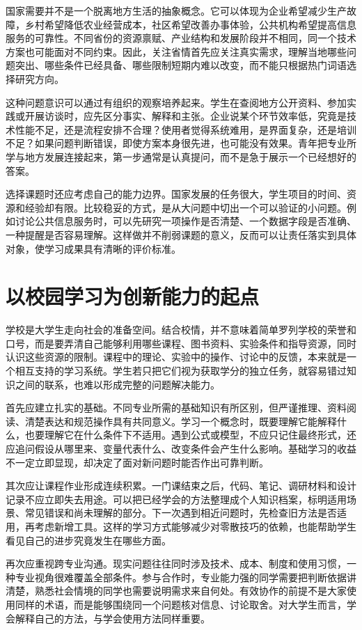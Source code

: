 \documentclass[UTF8,a4paper,zihao=-4,fontset=fandol]{ctexart}
\begin{document}
国家需要并不是一个脱离地方生活的抽象概念。它可以体现为企业希望减少生产故障，乡村希望降低农业经营成本，社区希望改善办事体验，公共机构希望提高信息服务的可靠性。不同省份的资源禀赋、产业结构和发展阶段并不相同，同一个技术方案也可能面对不同约束。因此，关注省情首先应关注真实需求，理解当地哪些问题突出、哪些条件已经具备、哪些限制短期内难以改变，而不能只根据热门词语选择研究方向。

这种问题意识可以通过有组织的观察培养起来。学生在查阅地方公开资料、参加实践或开展访谈时，应先区分事实、解释和主张。企业说某个环节效率低，究竟是技术性能不足，还是流程安排不合理？使用者觉得系统难用，是界面复杂，还是培训不足？如果问题判断错误，即使方案本身很先进，也可能没有效果。青年把专业所学与地方发展连接起来，第一步通常是认真提问，而不是急于展示一个已经想好的答案。

选择课题时还应考虑自己的能力边界。国家发展的任务很大，学生项目的时间、资源和经验却有限。比较稳妥的方式，是从大问题中切出一个可以验证的小问题。例如讨论公共信息服务时，可以先研究一项操作是否清楚、一个数据字段是否准确、一种提醒是否容易理解。这样做并不削弱课题的意义，反而可以让责任落实到具体对象，使学习成果具有清晰的评价标准。

\section{以校园学习为创新能力的起点}
学校是大学生走向社会的准备空间。结合校情，并不意味着简单罗列学校的荣誉和口号，而是要弄清自己能够利用哪些课程、图书资料、实验条件和指导资源，同时认识这些资源的限制。课程中的理论、实验中的操作、讨论中的反馈，本来就是一个相互支持的学习系统。学生若只把它们视为获取学分的独立任务，就容易错过知识之间的联系，也难以形成完整的问题解决能力。

首先应建立扎实的基础。不同专业所需的基础知识有所区别，但严谨推理、资料阅读、清楚表达和规范操作具有共同意义。学习一个概念时，既要理解它能解释什么，也要理解它在什么条件下不适用。遇到公式或模型，不应只记住最终形式，还应追问假设从哪里来、变量代表什么、改变条件会产生什么影响。基础学习的收益不一定立即显现，却决定了面对新问题时能否作出可靠判断。

其次应让课程作业形成连续积累。一门课结束之后，代码、笔记、调研材料和设计记录不应立即失去用途。可以把已经学会的方法整理成个人知识档案，标明适用场景、常见错误和尚未理解的部分。下一次遇到相近问题时，先检查旧方法是否适用，再考虑新增工具。这样的学习方式能够减少对零散技巧的依赖，也能帮助学生看见自己的进步究竟发生在哪些方面。

再次应重视跨专业沟通。现实问题往往同时涉及技术、成本、制度和使用习惯，一种专业视角很难覆盖全部条件。参与合作时，专业能力强的同学需要把判断依据讲清楚，熟悉社会情境的同学也需要说明需求来自何处。有效协作的前提不是大家使用同样的术语，而是能够围绕同一个问题核对信息、讨论取舍。对大学生而言，学会解释自己的方法，与学会使用方法同样重要。
\end{document}
